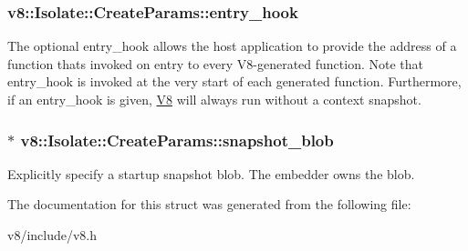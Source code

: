 \subsubsection[{entry\+\_\+hook}]{ v8\+::\+Isolate\+::\+Create\+Params\+::entry\+\_\+hook}\label{structv8_1_1Isolate_1_1CreateParams_aa7aa18bbe2d86713e5b074a93b38dc60}
The optional entry\+\_\+hook allows the host application to provide the address of a function that\textquotesingle{}s invoked on entry to every V8-\/generated function. Note that entry\+\_\+hook is invoked at the very start of each generated function. Furthermore, if an entry\+\_\+hook is given, \hyperlink{classv8_1_1V8}{V8} will always run without a context snapshot. \hypertarget{structv8_1_1Isolate_1_1CreateParams_a25d38476e4dec79ae96c59292eee4a64}{}
\subsubsection[{snapshot\+\_\+blob}]{$\ast$ v8\+::\+Isolate\+::\+Create\+Params\+::snapshot\+\_\+blob}\label{structv8_1_1Isolate_1_1CreateParams_a25d38476e4dec79ae96c59292eee4a64}
Explicitly specify a startup snapshot blob. The embedder owns the blob. 

The documentation for this struct was generated from the following file\+:\begin{DoxyCompactItemize}
\item 
v8/include/v8.\+h\end{DoxyCompactItemize}
